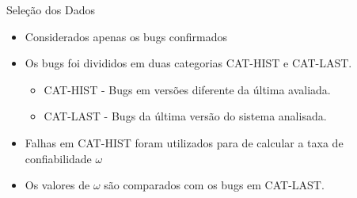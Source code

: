 \documentclass[t,14pt,mathserif]{beamer}
\begin{document}
\begin{frame}{Seleção dos Dados}
	\begin{itemize}
		\item Considerados apenas os bugs confirmados
		\item Os bugs foi divididos em duas categorias \textsc{CAT-HIST} e \textsc{CAT-LAST}.
		\begin{itemize}
			\item \textsc{CAT-HIST} - Bugs em versões diferente da última avaliada.
			\item \textsc{CAT-LAST} - Bugs da última versão do sistema analisada.
		\end{itemize}
		\item Falhas em \textsc{CAT-HIST} foram utilizados para de calcular a taxa de confiabilidade $\omega$ 			\item Os valores de $\omega$ são comparados com os bugs em \textsc{CAT-LAST}.
	\end{itemize}
\end{frame}

\end{document}
